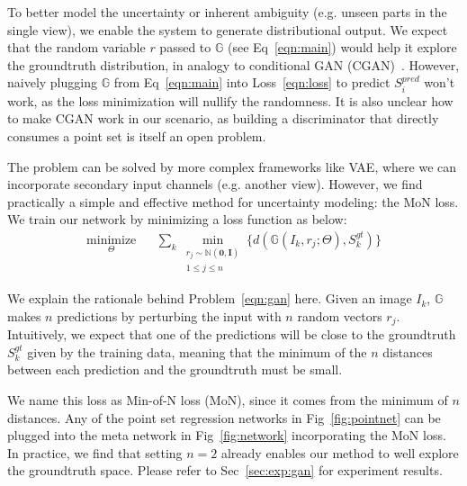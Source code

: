 To better model the uncertainty or inherent ambiguity (e.g. unseen parts in the single view), we enable the system to generate distributional output. We expect that the random variable $r$ passed to $\mathbb{G}$ (see Eq~\eqref{eqn:main}) would help it explore the groundtruth distribution, in analogy to conditional GAN (CGAN)~\cite{mirza2014conditional}. However, naively plugging $\mathbb{G}$ from Eq~\eqref{eqn:main} into Loss~\eqref{eqn:loss} to predict $S_i^{pred}$ won't work, as the loss minimization will nullify the randomness. It is also unclear how to make CGAN work in our scenario, as building a discriminator that directly consumes a point set is itself an open problem. 

The problem can be solved by more complex frameworks like VAE, where we can incorporate secondary input channels (e.g. another view). However, we find practically a simple and effective method for uncertainty modeling: the MoN loss. We train our network by minimizing a loss function as below:
\begin{equation}
    \begin{aligned}
    \underset{\Theta}{\mbox{minimize}} 
    && 
    \sum_k 
        \min_{
            \substack{r_j\sim \mathbb{N}(\mathbf{0}, \mathbf{I})\\1\le j\le n}
        }
        \{
            d(\mathbb{G}(I_k, r_j;\Theta), S_k^{gt})
        \}
    \end{aligned} 
    \label{eqn:gan}
\end{equation}    

We explain the rationale behind Problem~\eqref{eqn:gan} here. Given an image $I_k$, $\mathbb{G}$ makes $n$ predictions by perturbing the input with $n$ random vectors $r_j$. Intuitively, we expect that one of the predictions will be close to the groundtruth $S_k^{gt}$ given by the training data, meaning that the minimum of the $n$ distances between each prediction and the groundtruth must be small. 

We name this loss as Min-of-N loss (MoN), since it comes from the minimum of $n$ distances. Any of the point set regression networks in Fig~\ref{fig:pointnet} can be plugged into the meta network in Fig~\ref{fig:network} incorporating the MoN loss. In practice, we find that setting $n=2$ already enables our method to well explore the groundtruth space.  Please refer to Sec~\ref{sec:exp:gan} for experiment results.

